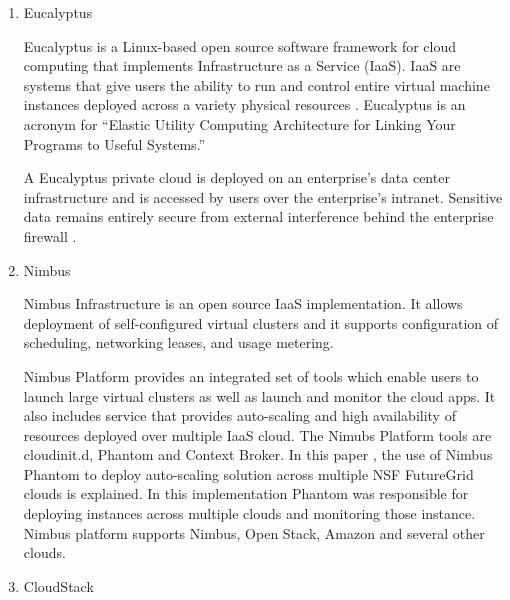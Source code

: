 \begin{enumerate}
\item {} 
Eucalyptus

Eucalyptus is a Linux-based open source software framework for
cloud computing that implements Infrastructure as a Service
(IaaS). IaaS are systems that give users the ability to run and
control entire virtual machine instances deployed across a
variety physical resources \label{\detokenize{i524/technologies:id640}}{\hyperref[\detokenize{i524/technologies:paper-eucalyptus}]{\sphinxcrossref{{[}553{]}}}}. Eucalyptus
is an acronym for “Elastic Utility Computing Architecture for
Linking Your Programs to Useful Systems.”

A Eucalyptus private cloud is deployed on an enterprise’s data
center infrastructure and is accessed by users over the
enterprise’s intranet. Sensitive data remains entirely secure
from external interference behind the enterprise firewall
\label{\detokenize{i524/technologies:id641}}{\hyperref[\detokenize{i524/technologies:www-eucalyptus}]{\sphinxcrossref{{[}554{]}}}}.

\item {} 
Nimbus

Nimbus Infrastructure \label{\detokenize{i524/technologies:id642}}{\hyperref[\detokenize{i524/technologies:www-nimbus-wiki}]{\sphinxcrossref{{[}555{]}}}} is an open source
IaaS implementation. It allows deployment of self-configured
virtual clusters and it supports configuration of scheduling,
networking leases, and usage metering.

Nimbus Platform \label{\detokenize{i524/technologies:id643}}{\hyperref[\detokenize{i524/technologies:www-nimbus}]{\sphinxcrossref{{[}556{]}}}} provides an integrated set of
tools which enable users to launch large virtual clusters as well
as launch and monitor the cloud apps. It also includes service
that provides auto-scaling and high availability of resources
deployed over multiple IaaS cloud.  The Nimubs Platform tools are
cloudinit.d, Phantom and Context Broker.  In this paper
\label{\detokenize{i524/technologies:id644}}{\hyperref[\detokenize{i524/technologies:nimbus-paper}]{\sphinxcrossref{{[}557{]}}}}, the use of Nimbus Phantom
to deploy auto-scaling solution across multiple NSF FutureGrid
clouds is explained. In this implementation Phantom was responsible
for deploying instances across multiple clouds and monitoring those
instance.  Nimbus platform supports Nimbus, Open Stack, Amazon
and several other clouds.

\item {} 
CloudStack


\end{enumerate}
